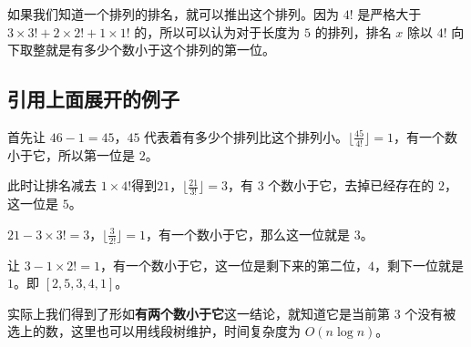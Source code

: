 如果我们知道一个排列的排名，就可以推出这个排列。因为 $4!$ 是严格大于 $3\times 3!+2\times 2!+1\times 1!$ 的，所以可以认为对于长度为 $5$ 的排列，排名 $x$ 除以 $4!$ 向下取整就是有多少个数小于这个排列的第一位。

\subsection{引用上面展开的例子}

首先让 $46-1=45$，$45$ 代表着有多少个排列比这个排列小。$\lfloor\frac {45}{4!}\rfloor=1$，有一个数小于它，所以第一位是 $2$。

此时让排名减去 $1\times 4!$得到$21$，$\lfloor\frac {21}{3!}\rfloor=3$，有 $3$ 个数小于它，去掉已经存在的 $2$，这一位是 $5$。

$21-3\times 3!=3$，$\lfloor\frac {3}{2!}\rfloor=1$，有一个数小于它，那么这一位就是 $3$。

让 $3-1\times 2!=1$，有一个数小于它，这一位是剩下来的第二位，$4$，剩下一位就是 $1$。即 $[2,5,3,4,1]$。

实际上我们得到了形如\textbf{有两个数小于它}这一结论，就知道它是当前第 $3$ 个没有被选上的数，这里也可以用线段树维护，时间复杂度为 $O(n\log n)$。
